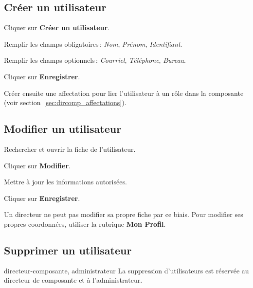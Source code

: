 \subsection{Cr\'eer un utilisateur}

\begin{steps}
  \item Cliquer sur \textbf{Cr\'eer un utilisateur}.
  \item Remplir les champs obligatoires\,: \textit{Nom}, \textit{Pr\'enom}, \textit{Identifiant}.
  \item Remplir les champs optionnels\,: \textit{Courriel}, \textit{T\'el\'ephone}, \textit{Bureau}.
  \item Cliquer sur \textbf{Enregistrer}.
  \item Cr\'eer ensuite une affectation pour lier l'utilisateur \`a un r\^ole dans la composante (voir section~\ref{sec:dircomp_affectations}).
\end{steps}

\subsection{Modifier un utilisateur}

\begin{steps}
  \item Rechercher et ouvrir la fiche de l'utilisateur.
  \item Cliquer sur \textbf{Modifier}.
  \item Mettre \`a jour les informations autoris\'ees.
  \item Cliquer sur \textbf{Enregistrer}.
\end{steps}

\begin{warnbox}
  Un directeur ne peut pas modifier sa propre fiche par ce biais. Pour modifier ses propres coordonn\'ees, utiliser la rubrique \textbf{Mon Profil}.
\end{warnbox}

\subsection{Supprimer un utilisateur}

\begin{rolebox}{directeur-composante, administrateur}
  La suppression d'utilisateurs est r\'eserv\'ee au directeur de composante et \`a l'administrateur.
\end{rolebox}

